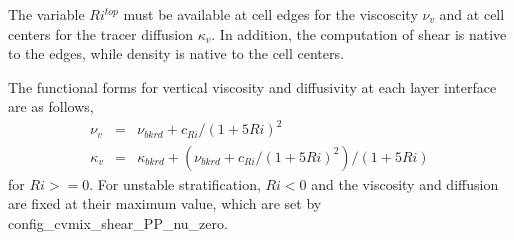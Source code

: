 The variable $Ri^{top}$ must be available at cell edges for the viscoscity $\nu_v$ and at cell centers for the tracer diffusion $\kappa_v$.  In addition, the computation of shear is native to the edges, while density is native to the cell centers.  

The functional forms for vertical viscosity and diffusivity at each layer interface are as follows,
\begin{eqnarray} \label{ocean:\mode_visc1}  
\nu_v &=& \nu_{bkrd} + c_{Ri}/(1+5Ri)^2\\
\kappa_v &=& \kappa_{bkrd} + (\nu_{bkrd} + c_{Ri}/(1+5Ri)^2)/(1+5Ri)
\end{eqnarray}
for $Ri>=0$.  For unstable stratification, $Ri<0$ and the viscosity and diffusion are fixed at their maximum value, which are set by config\_cvmix\_shear\_PP\_nu\_zero.



